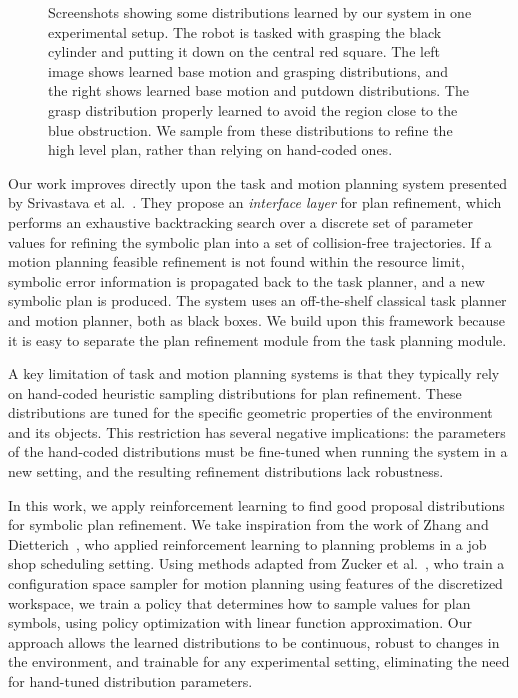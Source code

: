 \begin{figure}[h]
  \caption{Screenshots showing some distributions learned by our system in one experimental
    setup. The robot is tasked with grasping the black cylinder and putting it down on the
    central red square. The left image shows learned base motion and grasping distributions,
    and the right shows learned base motion and putdown distributions. The grasp distribution
    properly learned to avoid the region close to the blue obstruction. We sample from these distributions
    to refine the high level plan, rather than relying on hand-coded ones.}
  \label{fig:cover}
\end{figure}

Our work improves directly upon the task and motion planning system
presented by Srivastava et al.~\cite{srivastava2014combined}. They propose
an \emph{interface layer} for plan refinement, which performs an exhaustive
backtracking search over a discrete set of parameter values for refining
the symbolic plan into a set of collision-free trajectories. If a motion
planning feasible refinement is not found within the resource limit,
symbolic error information is propagated back to the task planner, and a new symbolic plan is produced.
The system uses an off-the-shelf classical task planner and motion planner, both as black boxes.
We build upon this framework because it is easy to separate the plan refinement module from the task planning module.

A key limitation of task and motion planning systems is that they typically rely on hand-coded heuristic
sampling distributions for plan refinement. These distributions are tuned for the specific
geometric properties of the environment and its objects.
This restriction has several negative implications: the parameters of the
hand-coded distributions must be fine-tuned when running the system in a new setting, and the
resulting refinement distributions lack robustness.

In this work, we apply reinforcement learning to find good proposal distributions
for symbolic plan refinement. We take inspiration
from the work of Zhang and Dietterich~\cite{JobShopSched}, who applied reinforcement learning
to planning problems in a job shop scheduling setting. Using methods adapted from
Zucker et al.~\cite{workspacebias}, who train a configuration space sampler for motion planning
using features of the discretized workspace, we train a policy that
determines how to sample values for plan symbols, using policy optimization with linear function
approximation. Our approach allows the learned distributions to be continuous, robust to changes in
the environment, and trainable for any experimental setting, eliminating the need for hand-tuned
distribution parameters.

